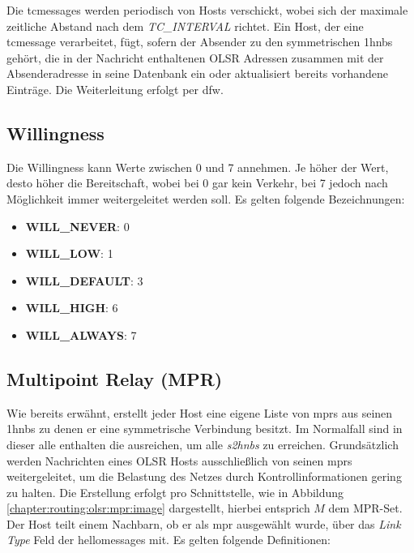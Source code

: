
Die \glspl{tcmessage} werden periodisch von Hosts verschickt, wobei sich der maximale zeitliche Abstand nach dem \textit{TC\_INTERVAL} richtet. Ein Host, der eine \gls{tcmessage} verarbeitet, fügt, sofern der Absender zu den symmetrischen \glspl{1hnb} gehört, die in der Nachricht enthaltenen OLSR Adressen zusammen mit der Absenderadresse in seine Datenbank ein oder aktualisiert bereits vorhandene Einträge. Die Weiterleitung erfolgt per \gls{dfw}.

\subsection{Willingness}
\label{chapter:routing:olsr:willingness}

Die Willingness kann Werte zwischen 0 und 7 annehmen. Je höher der Wert, desto höher die Bereitschaft, wobei bei 0 gar kein Verkehr, bei 7 jedoch nach Möglichkeit immer weitergeleitet werden soll. Es gelten folgende Bezeichnungen:

\begin{itemize}
\item \textbf{WILL\_NEVER}: 0
\item \textbf{WILL\_LOW}: 1
\item \textbf{WILL\_DEFAULT}: 3
\item \textbf{WILL\_HIGH}: 6
\item \textbf{WILL\_ALWAYS}: 7
\end{itemize}

\subsection{Multipoint Relay (MPR)}
\label{chapter:routing:olsr:mpr}

Wie bereits erwähnt, erstellt jeder Host eine eigene Liste von \glspl{mpr} aus seinen \glspl{1hnb} zu denen er eine symmetrische Verbindung besitzt. Im Normalfall sind in dieser alle enthalten die ausreichen, um alle \textit{\glspl{s2hnb}} zu erreichen. Grundsätzlich werden Nachrichten eines OLSR Hosts ausschließlich von seinen \glspl{mpr} weitergeleitet, um die Belastung des Netzes durch Kontrollinformationen gering zu halten. Die Erstellung erfolgt pro Schnittstelle, wie in Abbildung \ref{chapter:routing:olsr:mpr:image} dargestellt, hierbei entsprich $M$ dem MPR-Set. Der Host teilt einem Nachbarn, ob er als \gls{mpr} ausgewählt wurde, über das \textit{Link Type} Feld der \glspl{hellomessage} mit. Es gelten folgende Definitionen:

